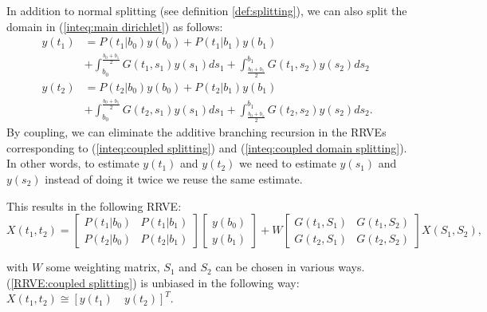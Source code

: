 \documentclass[a4paper,12pt]{article}
\begin{document}
\begin{example} \label{ex:coupled splitting}
  In addition to normal splitting (see definition \ref{def:splitting}),
  we can also split the domain in (\ref{inteq:main dirichlet})
  as follows:
  \begin{align}\label{inteq:coupled splitting}
    y(t_1) & = P(t_1|b_{0}) y(b_{0}) + P(t_1|b_{1}) y(b_{1})                \\
           & + \int_{b_{0}}^{\frac{b_{0}+b_{1}}{2}} G(t_1,s_1)y(s_1) ds_1 +
    \int_{\frac{b_{0}+b_{1}}{2}}^{b_{1}} G(t_1,s_2)y(s_2) ds_2              \\ \label{inteq:coupled domain splitting}
    y(t_2) & = P(t_2|b_{0}) y(b_{0}) + P(t_2|b_{1}) y(b_{1})                \\
           & + \int_{b_{0}}^{\frac{b_{0}+b_{1}}{2}} G(t_2,s_1)y(s_1) ds_1
    +\int_{\frac{b_{0}+b_{1}}{2}}^{b_{1}} G(t_2,s_2)y(s_2) ds_2.
  \end{align}
  By coupling, we can eliminate the additive branching recursion
  in the RRVEs corresponding to (\ref{inteq:coupled splitting})
  and (\ref{inteq:coupled domain splitting}). In other words,
  to estimate $y(t_1)$ and $y(t_2)$ we need to estimate $y(s_1)$ and $y(s_2)$
  instead of doing it twice we reuse the same estimate.

  This results in the following RRVE:
  \begin{equation} \label{RRVE:coupled splitting}
    X(t_{1},t_{2})=
    \begin{bmatrix}
      P(t_{1}|b_{0}) & P(t_{1}|b_{1}) \\
      P(t_{2}|b_{0}) & P(t_{2}|b_{1})
    \end{bmatrix}
    \begin{bmatrix}
      y(b_{0}) \\
      y(b_{1})
    \end{bmatrix}
    +
    W
    \begin{bmatrix}
      G(t_{1},S_{1}) & G(t_{1},S_{2}) \\
      G(t_{2},S_{1}) & G(t_{2},S_{2})
    \end{bmatrix}
    X(S_{1},S_{2}),
  \end{equation}

  with $W$ some weighting matrix,
  $S_{1}$ and $S_{2}$ can be chosen
  in various ways. (\ref{RRVE:coupled splitting}) is unbiased in the following way:
  $X(t_{1},t_{2}) \cong [y(t_{1}) \quad y(t_{2})]^{T}$.

\end{example}
\end{document}
